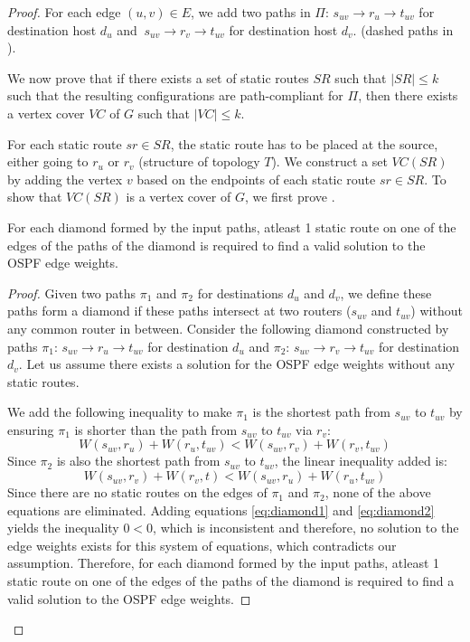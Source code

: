 \begin{proof}
For each edge $(u,v) \in E$, we add two paths in $\Pi$: 
$s_{uv} \rightarrow r_u \rightarrow t_{uv}$
for destination host $d_u$ and 
$~s_{uv} \rightarrow r_v \rightarrow t_{uv}$ 
for destination host $d_v$.
(dashed paths in ). 

We now prove that if there exists a set of static routes
$SR$ such that $|SR| \leq k$ such that the resulting configurations
are path-compliant for $\Pi$, then there exists a vertex cover $VC$
of $G$ such that $|VC| \leq k$. 

For each static route $sr \in SR$, the static route
has to be placed at the source, either going to $r_u$
or $r_v$ (structure of topology $T$). 
We construct a set $VC(SR)$ by adding the vertex $v$
based on the endpoints of each static route $sr \in SR$.
To show that $VC(SR)$ is a vertex cover of $G$, we first
prove .

\begin{lemma} \label{lemma:diamond}
	 For each diamond formed by the input paths, atleast 1 
	 static route on one of the edges of the paths of the diamond 
	 is required to find a valid solution to the
	 OSPF edge weights.  
\end{lemma}

\begin{proof}
Given two paths $\pi_1$ and $\pi_2$ for destinations 
$d_u$ and $d_v$, we define these paths form a diamond
if these paths intersect at two routers ($s_{uv}$ and $t_{uv}$) 
without any common router in between. 
Consider the following diamond %
constructed by paths $\pi_1$: $s_{uv} \rightarrow r_u \rightarrow t_{uv}$ 
for destination $d_u$ and $\pi_2$: $s_{uv} \rightarrow r_v \rightarrow t_{uv}$ 
for destination $d_v$. Let us assume there exists a solution 
for the OSPF edge weights without any static routes. 

We add the following inequality 
to make $\pi_1$ is the shortest 
path from $s_{uv}$ to $t_{uv}$ by
ensuring
 $\pi_1$ is shorter than the
path from $s_{uv}$ to $t_{uv}$ via $r_v$: 
\begin{equation} \label{eq:diamond1}
	W(s_{uv},r_u) + W(r_u, t_{uv}) < W(s_{uv}, r_v) + W(r_v,t_{uv})
\end{equation}
Since $\pi_2$ is also the shortest path from $s_{uv}$ 
to $t_{uv}$, the linear inequality added is:
\begin{equation}  \label{eq:diamond2}
W(s_{uv},r_v) + W(r_v, t) < W(s_{uv}, r_u) + W(r_u,t_{uv})
\end{equation}
Since there are no static routes on the edges
of $\pi_1$ and $\pi_2$, none of the above equations are 
eliminated. 
Adding equations \ref{eq:diamond1} and  \ref{eq:diamond2} 
yields the inequality $0 < 0$, which is inconsistent 
and therefore, no solution to 
the edge weights exists for this system of equations, 
which contradicts our assumption. Therefore,
for each diamond formed by the input paths, atleast 1 
static route on one of the edges of the paths of the diamond 
is required to find a valid solution to the
OSPF edge weights.  
\end{proof}


\end{proof}
